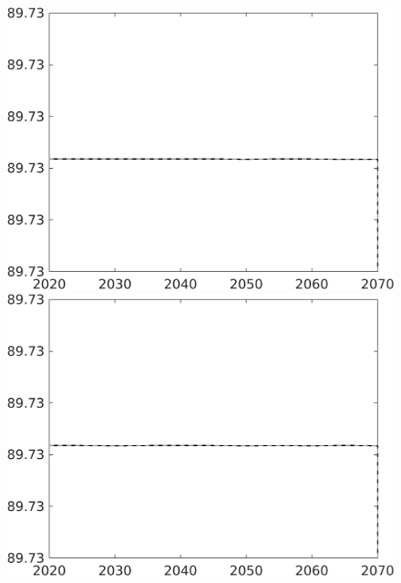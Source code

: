 \begin{figure}[h!!]
\begin{minipage}[]{0.32\textwidth}
	\end{minipage}	
	\begin{minipage}[]{0.32\textwidth}
		\includegraphics[width=1\textwidth]{../../codding_model/own_basedOnFried/optimalPol_010922_revision/figures/all_13Sept22/CompTaul_Equlab_LFBAU_Reg0_gAg_spillover0_nsk1_xgr1_knspil1_sep1_countec0_GovRev0_etaa0.79_lgd0.png}
	\end{minipage}	
	\begin{minipage}[]{0.32\textwidth}
		\includegraphics[width=1\textwidth]{../../codding_model/own_basedOnFried/optimalPol_010922_revision/figures/all_13Sept22/CompTaul_Equlab_LFBAU_Reg0_gAf_spillover0_nsk1_xgr1_knspil1_sep1_countec0_GovRev0_etaa0.79_lgd0.png}

\end{minipage}
\end{figure}
